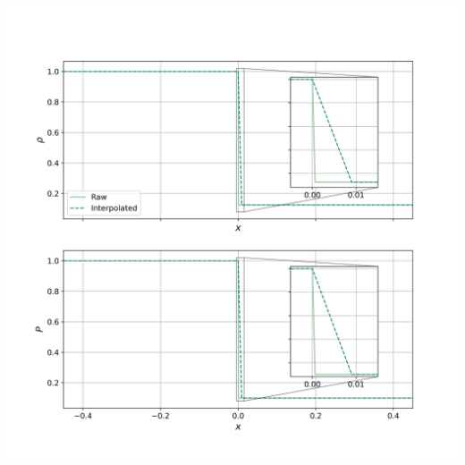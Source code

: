 \documentclass[11pt, a4paper]{article}
\begin{document}
\begin{center}
    \centering
    \includegraphics[width=1\linewidth]{images/all_1600_initial_compare.png}
    \label{fig:all_1600_initial_compare}
\end{center}
\end{document}
